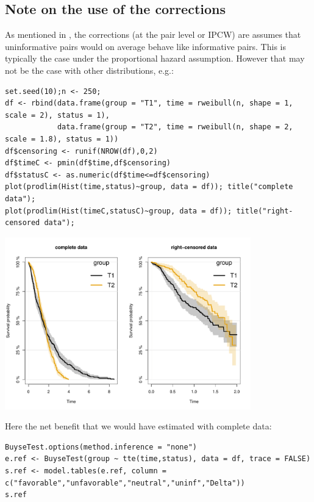 \documentclass[12pt]{article}
\begin{document}
\subsection{Note on the use of the corrections}
\label{sec:orga226a79}

As mentioned in \cite{peron2021correcting}, the corrections (at the pair
level or IPCW) are assumes that uninformative pairs would on average
behave like informative pairs. This is typically the case under the
proportional hazard assumption. However that may not be the case with
other distributions, e.g.:
\lstset{language=r,label= ,caption= ,captionpos=b,numbers=none}
\begin{lstlisting}
set.seed(10);n <- 250; 
df <- rbind(data.frame(group = "T1", time = rweibull(n, shape = 1, scale = 2), status = 1),
            data.frame(group = "T2", time = rweibull(n, shape = 2, scale = 1.8), status = 1))
df$censoring <- runif(NROW(df),0,2)
df$timeC <- pmin(df$time,df$censoring)
df$statusC <- as.numeric(df$time<=df$censoring)
plot(prodlim(Hist(time,status)~group, data = df)); title("complete data");
plot(prodlim(Hist(timeC,statusC)~group, data = df)); title("right-censored data");
\end{lstlisting}
\begin{center}
\includegraphics[width=0.8\textwidth]{./figures/plot-crossingSurv.pdf}
\end{center}

Here the net benefit that we would have estimated with complete data:
\lstset{language=r,label= ,caption= ,captionpos=b,numbers=none}
\begin{lstlisting}
BuyseTest.options(method.inference = "none")
e.ref <- BuyseTest(group ~ tte(time,status), data = df, trace = FALSE)
s.ref <- model.tables(e.ref, column = c("favorable","unfavorable","neutral","uninf","Delta"))
s.ref
\end{lstlisting}
\end{document}
